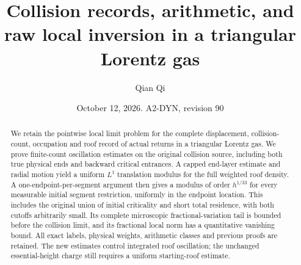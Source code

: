 \documentclass[11pt,reqno]{amsart}
\title[Collision records and raw local inversion]{Collision records, arithmetic, and raw local inversion in a triangular Lorentz gas}
\author{Qian Qi}
\date{October 12, 2026. A2-DYN, revision 90}
\numberwithin{equation}{section}
\theoremstyle{definition}
\theoremstyle{remark}\newtheorem{remark}[theorem]{Remark}
\begin{document}
\raggedbottom
\begin{abstract}
We retain the pointwise local limit problem for the complete displacement,
collision-count, occupation and roof record of actual returns in a
triangular Lorentz gas. We prove finite-count oscillation estimates on
the original collision source, including both true physical ends and
backward critical entrances. A capped end-layer estimate and radial
motion yield a uniform $L^1$ translation modulus for the full weighted
roof density. A one-endpoint-per-segment argument then gives a modulus
of order $h^{1/33}$ for every measurable initial segment restriction,
uniformly in the endpoint location. This includes the original union
of initial criticality and short total residence, with both cutoffs
arbitrarily small. Its complete microscopic fractional-variation tail
is bounded before the collision limit, and its fractional local norm
has a quantitative vanishing bound. All exact labels, physical weights,
arithmetic classes and previous proofs are retained. The new estimates
control integrated roof oscillation; the unchanged essential-height
charge still requires a uniform starting-roof estimate.
\end{abstract}
\maketitle


\end{document}
